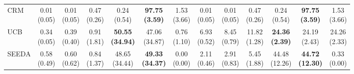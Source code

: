 {\begin{tabular}{l|cccccc|cccccc}
CRM & \makecell{0.01 \\ (0.05)} & \makecell{0.01 \\ (0.05)} & \makecell{0.47 \\ (0.26)} & {\cellcolor[HTML]{C8E6C9}} \makecell{0.24 \\ (0.54)} & \bfseries \makecell{97.75 \\ (3.59)} & \makecell{1.53 \\ (3.66)} & \makecell{0.01 \\ (0.05)} & \makecell{0.01 \\ (0.05)} & \makecell{0.47 \\ (0.26)} & {\cellcolor[HTML]{C8E6C9}} \makecell{0.24 \\ (0.54)} & \bfseries \makecell{97.75 \\ (3.59)} & \makecell{1.53 \\ (3.66)} \\
UCB & \makecell{0.34 \\ (0.05)} & \makecell{0.39 \\ (0.40)} & \makecell{0.91 \\ (1.81)} & {\cellcolor[HTML]{C8E6C9}} \bfseries \makecell{50.55 \\ (34.94)} & \makecell{47.06 \\ (34.87)} & \makecell{0.76 \\ (1.10)} & \makecell{6.93 \\ (0.52)} & \makecell{8.45 \\ (0.79)} & \makecell{11.82 \\ (1.28)} & {\cellcolor[HTML]{C8E6C9}} \bfseries \makecell{24.36 \\ (2.39)} & \makecell{24.19 \\ (2.43)} & \makecell{24.26 \\ (2.33)} \\
SEEDA & \makecell{0.58 \\ (0.49)} & \makecell{0.60 \\ (0.62)} & \makecell{0.84 \\ (1.37)} & {\cellcolor[HTML]{C8E6C9}} \makecell{48.65 \\ (34.44)} & \bfseries \makecell{49.33 \\ (34.37)} & \makecell{0.00 \\ (0.00)} & \makecell{2.11 \\ (0.46)} & \makecell{2.91 \\ (0.83)} & \makecell{5.45 \\ (1.88)} & {\cellcolor[HTML]{C8E6C9}} \makecell{44.48 \\ (12.26)} & \bfseries \makecell{44.72 \\ (12.30)} & \makecell{0.33 \\ (0.00)} \\

\end{tabular}}
